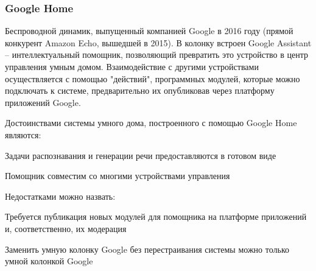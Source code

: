 \subsubsection{Google Home}

Беспроводной динамик, выпущенный компанией Google в 2016 году (прямой конкурент Amazon Echo, вышедшей в 2015).
В колонку встроен Google Assistant -- интеллектуальный помощник, позволяющий превратить это устройство в центр управления умным домом.
Взаимодействие с другими устройствами осуществляется с помощью "действий", программных модулей, которые можно подключать к системе, предварительно их опубликовав через платформу приложений Google.
\cite{GoogleHomeApps}

Достоинствами системы умного дома, построенного с помощью Google Home являются:
\begin{list}{}{}
    \item Задачи распознавания и генерации речи предоставляются в готовом виде
    \item Помощник совместим со многими устройствами управления \cite{GoogleHomeDevices}
\end{list}
Недостатками можно назвать:
\begin{list}{}{}
    \item Требуется публикация новых модулей для помощника на платформе приложений и, соответственно, их модерация
    \item Заменить умную колонку Google без перестраивания системы можно только умной колонкой Google
\end{list}
